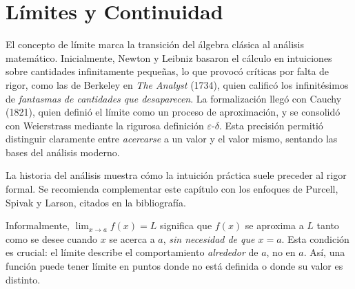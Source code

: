 
\chapter{Límites y Continuidad}

El concepto de límite marca la transición del álgebra clásica al análisis
matemático. Inicialmente, Newton y Leibniz basaron el cálculo en intuiciones
sobre cantidades infinitamente pequeñas, lo que provocó críticas por falta
de rigor, como las de Berkeley en \emph{The Analyst} (1734), quien calificó
los infinitésimos de \emph{fantasmas de cantidades que desaparecen}. La
formalización llegó con Cauchy (1821), quien definió el límite como un proceso
de aproximación, y se consolidó con Weierstrass mediante la rigurosa definición
$\varepsilon$-$\delta$. Esta precisión permitió distinguir claramente entre
\emph{acercarse} a un valor y el valor mismo, sentando las bases del análisis
moderno.

\begin{rem}
La historia del análisis muestra cómo la intuición práctica suele preceder
al rigor formal. Se recomienda complementar este capítulo con los enfoques
de Purcell, Spivak y Larson, citados en la bibliografía.
\end{rem}

Informalmente, $\lim_{x\to a}f(x)=L$ significa que $f(x)$ se aproxima a $L$
tanto como se desee cuando $x$ se acerca a $a$, \emph{sin necesidad de que
$x=a$}. Esta condición es crucial: el límite describe el comportamiento
\emph{alrededor} de $a$, no en $a$. Así, una función puede tener límite en
puntos donde no está definida o donde su valor es distinto.

